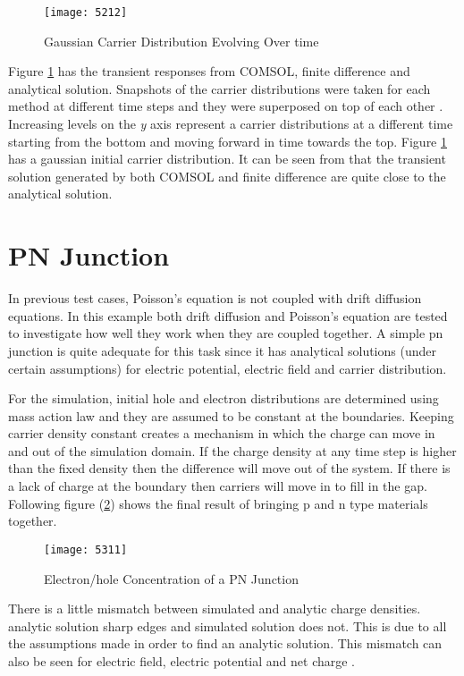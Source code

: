 \begin{doublespace}
\begin{figure}[ht]
\centering
\texttt{[image: 5212]}
\caption{Gaussian Carrier Distribution Evolving Over time} 
\label{51}
\end{figure}

Figure \ref{51} has the transient responses from COMSOL, finite difference and analytical solution. Snapshots of the carrier distributions were taken for each method at different time steps and they were superposed on top of each other . Increasing levels on the \textit{y} axis represent a carrier distributions at a different time starting from the bottom and moving forward in time towards the top. Figure \ref{51} has a gaussian initial carrier distribution. It can be seen from that the transient solution generated by both COMSOL and finite difference are quite close to the analytical solution.


\clearpage
\section{PN Junction}
In previous test cases, Poisson's equation is not coupled with drift diffusion equations. In this example both drift diffusion and Poisson's equation are tested to investigate how well they work when they are coupled together. A simple pn junction is quite adequate for this task since it has analytical solutions (under certain assumptions) for electric potential, electric field and carrier distribution.

For the simulation, initial hole and electron distributions are determined using mass action law and they are assumed to be constant at the boundaries. Keeping carrier density constant creates a mechanism in which the charge can move in and out of the simulation domain. If the charge density at any time step is higher than the fixed density then the difference will move out of the system. If there is a lack of charge at the boundary then carriers will move in to fill in the gap. Following figure (\ref{npcon}) shows the final result of bringing p and n type materials together. 
 
\begin{figure}[ht]
\centering
\texttt{[image: 5311]}
\caption{Electron/hole Concentration of a PN Junction} 
\label{npcon}
\end{figure}

There is a little mismatch between simulated and analytic charge densities.  analytic solution  sharp edges and  simulated solution does not. This is due to all the assumptions made in order to find an analytic solution. This mismatch can also be seen for electric field, electric potential and net charge .


\end{doublespace}
